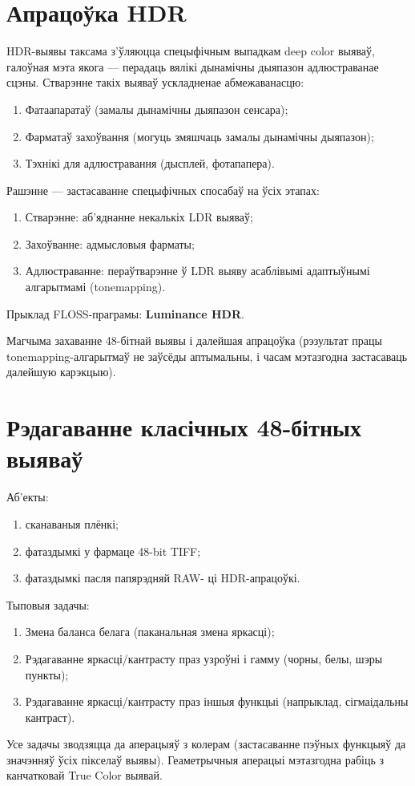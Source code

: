 \documentclass[10pt, a5paper]{article}
\begin{document}
\section*{Апрацоўка HDR}

HDR-выявы таксама з'ўляюцца спецыфічным выпадкам deep color выяваў, галоўная мэта якога --- перадаць вялікі дынамічны дыяпазон адлюстраванае сцэны. Стварэнне такіх выяваў ускладненае абмежаванасцю:
\begin{enumerate}
 \item  Фатаапаратаў (замалы дынамічны дыяпазон сенсара);
\item  Фарматаў захоўвання (могуць змяшчаць замалы дынамічны дыяпазон);
\item  Тэхнікі для адлюстравання (дысплей, фотапапера).
\end{enumerate}
Рашэнне --- застасаванне спецыфічных спосабаў на ўсіх этапах:
\begin{enumerate}
\item  Стварэнне: аб'яднанне некалькіх LDR выяваў;
\item  Захоўванне: адмысловыя фарматы;
\item  Адлюстраванне: пераўтварэнне ў LDR выяву асаблівымі адаптыўнымі алгарытмамі (tonemapping).
\end{enumerate}

Прыклад FLOSS-праграмы: \textbf{Luminance HDR}.

Магчыма захаванне 48-бітнай выявы і далейшая апрацоўка (рэзультат працы tonemapping-алгарытмаў не заўсёды аптымальны, і часам мэтазгодна застасаваць далейшую карэкцыю).

\section*{Рэдагаванне класічных 48-бітных выяваў}

Аб'екты:
\begin{enumerate}
\item сканаваныя плёнкі;
\item фатаздымкі у фармаце 48-bit TIFF;
\item фатаздымкі пасля папярэдняй RAW- ці HDR-апрацоўкі.
\end{enumerate}
Тыповыя задачы:
\begin{enumerate}
\item Змена баланса белага (паканальная змена яркасці);
\item Рэдагаванне яркасці/кантрасту праз узроўні і гамму (чорны, белы, шэры пункты);
\item Рэдагаванне яркасці/кантрасту праз іншыя функцыі (напрыклад, сігмаідальны кантраст).
\end{enumerate}
Усе задачы зводзяцца да аперацыяў з колерам (застасаванне пэўных функцыяў да значэнняў ўсіх пікселаў выявы). Геаметрычныя аперацыі мэтазгодна рабіць з канчатковай True Color выявай.
\end{document}
